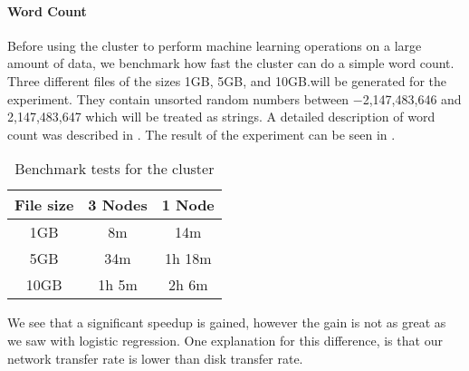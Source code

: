 \paragraph{Word Count}\label{sec:benchmark}


Before using the cluster to perform machine learning operations on a large amount of data, we benchmark how fast the cluster can do a simple word count. Three different files of the sizes 1GB, 5GB, and 10GB.\@ will be generated for the experiment. They contain unsorted random numbers between $-$2,147,483,646 and 2,147,483,647 which will be treated as strings. A detailed description of word count was described in . The result of the experiment can be seen in . 
\begin{table}[!htb]
  \centering
  \begin{tabular}{|c|c c|}
    \hline
    File size & 3 Nodes & 1 Node \\
    \hline
    1GB & 8m & 14m\\ %
    5GB & 34m & 1h 18m \\ %
    10GB & 1h 5m & 2h 6m \\ %
    \hline
  \end{tabular}
  \caption{Benchmark tests for the cluster}
  \label{tab:bench}
\end{table}

We see that a significant speedup is gained, however the gain is not as great as we saw with logistic regression. One explanation for this difference, is that our network transfer rate is lower than disk transfer rate.


